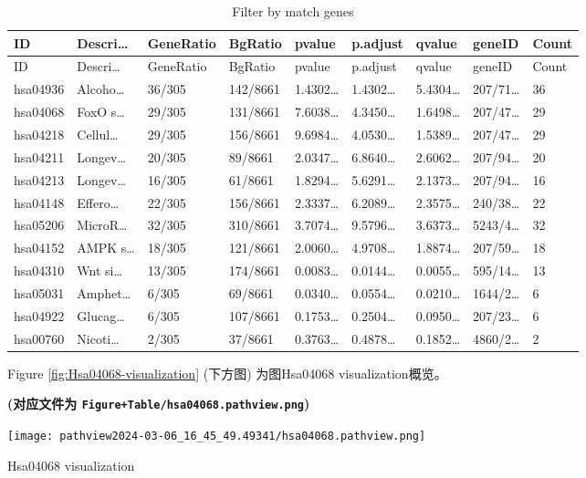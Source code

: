 \documentclass[
]{article}
\begin{document}
\begin{longtable}[]{@{}lllllllll@{}}
\caption{\label{tab:Filter-by-match-genes}Filter by match genes}\tabularnewline
\toprule
ID & Descri\ldots{} & GeneRatio & BgRatio & pvalue & p.adjust & qvalue & geneID & Count\tabularnewline
\midrule
\endfirsthead
\toprule
ID & Descri\ldots{} & GeneRatio & BgRatio & pvalue & p.adjust & qvalue & geneID & Count\tabularnewline
\midrule
\endhead
hsa04936 & Alcoho\ldots{} & 36/305 & 142/8661 & 1.4302\ldots{} & 1.4302\ldots{} & 5.4304\ldots{} & 207/71\ldots{} & 36\tabularnewline
hsa04068 & FoxO s\ldots{} & 29/305 & 131/8661 & 7.6038\ldots{} & 4.3450\ldots{} & 1.6498\ldots{} & 207/47\ldots{} & 29\tabularnewline
hsa04218 & Cellul\ldots{} & 29/305 & 156/8661 & 9.6984\ldots{} & 4.0530\ldots{} & 1.5389\ldots{} & 207/47\ldots{} & 29\tabularnewline
hsa04211 & Longev\ldots{} & 20/305 & 89/8661 & 2.0347\ldots{} & 6.8640\ldots{} & 2.6062\ldots{} & 207/94\ldots{} & 20\tabularnewline
hsa04213 & Longev\ldots{} & 16/305 & 61/8661 & 1.8294\ldots{} & 5.6291\ldots{} & 2.1373\ldots{} & 207/94\ldots{} & 16\tabularnewline
hsa04148 & Effero\ldots{} & 22/305 & 156/8661 & 2.3337\ldots{} & 6.2089\ldots{} & 2.3575\ldots{} & 240/38\ldots{} & 22\tabularnewline
hsa05206 & MicroR\ldots{} & 32/305 & 310/8661 & 3.7074\ldots{} & 9.5796\ldots{} & 3.6373\ldots{} & 5243/4\ldots{} & 32\tabularnewline
hsa04152 & AMPK s\ldots{} & 18/305 & 121/8661 & 2.0060\ldots{} & 4.9708\ldots{} & 1.8874\ldots{} & 207/59\ldots{} & 18\tabularnewline
hsa04310 & Wnt si\ldots{} & 13/305 & 174/8661 & 0.0083\ldots{} & 0.0144\ldots{} & 0.0055\ldots{} & 595/14\ldots{} & 13\tabularnewline
hsa05031 & Amphet\ldots{} & 6/305 & 69/8661 & 0.0340\ldots{} & 0.0554\ldots{} & 0.0210\ldots{} & 1644/2\ldots{} & 6\tabularnewline
hsa04922 & Glucag\ldots{} & 6/305 & 107/8661 & 0.1753\ldots{} & 0.2504\ldots{} & 0.0950\ldots{} & 207/23\ldots{} & 6\tabularnewline
hsa00760 & Nicoti\ldots{} & 2/305 & 37/8661 & 0.3763\ldots{} & 0.4878\ldots{} & 0.1852\ldots{} & 4860/2\ldots{} & 2\tabularnewline
\bottomrule
\end{longtable}

Figure \ref{fig:Hsa04068-visualization} (下方图) 为图Hsa04068 visualization概览。

\textbf{(对应文件为 \texttt{Figure+Table/hsa04068.pathview.png})}

\def\@captype{figure}
\begin{center}
\texttt{[image: pathview2024-03-06\_16\_45\_49.49341/hsa04068.pathview.png]}
\caption{Hsa04068 visualization}\label{fig:Hsa04068-visualization}
\end{center}
\end{document}
